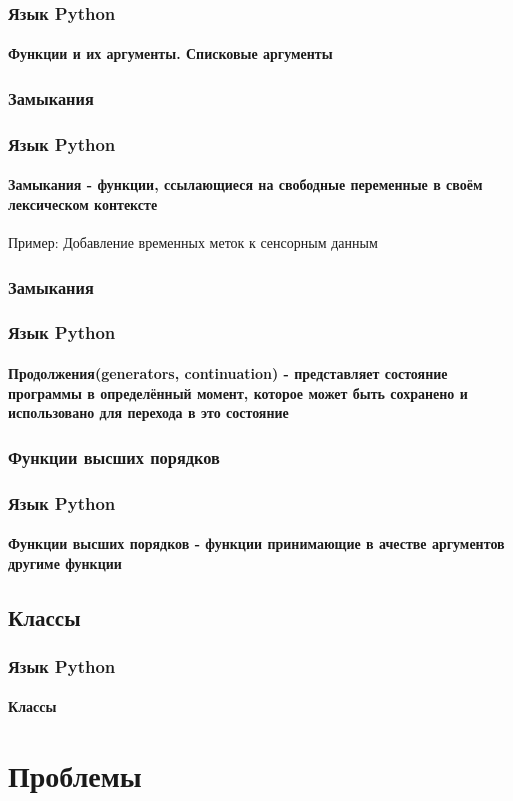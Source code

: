 \documentclass{beamer}
\begin{document}
\begin{frame}
\frametitle{Язык Python}
\framesubtitle{Функции и их аргументы. Списковые аргументы}

\end{frame}

\subsubsection{Замыкания}
\begin{frame}
\frametitle{Язык Python}
\framesubtitle{Замыкания - функции, ссылающиеся на свободные переменные в своём лексическом контексте}
Пример: Добавление временных меток к сенсорным данным

\end{frame}

\subsubsection{Замыкания}
\begin{frame}
\frametitle{Язык Python}
\framesubtitle{Продолжения(generators, continuation) - представляет состояние программы в определённый момент, которое может быть
сохранено и использовано для перехода в это состояние}

\end{frame}


\subsubsection{Функции высших порядков}
\begin{frame}
\frametitle{Язык Python}
\framesubtitle{Функции высших порядков - функции принимающие в ачестве аргументов другиме функции}

\end{frame}

\subsection{Классы}
\begin{frame}
\frametitle{Язык Python}
\framesubtitle{Классы}

\end{frame}


\section{Проблемы}
\end{document}
